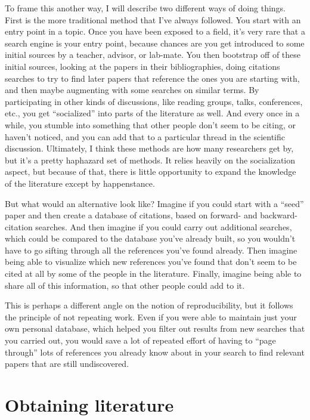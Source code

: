 \documentclass{book}
\begin{document}
To frame this another way, I will describe two different ways of doing things.  First is the more traditional method that I've always followed. You start with an entry point in a topic.  Once you have been exposed to a field, it's very rare that a search engine is your entry point, because chances are you get introduced to some initial sources by a teacher, advisor, or lab-mate.  You then bootstrap off of these initial sources, looking at the papers in their bibliographies, doing citations searches to try to find later papers that reference the ones you are starting with, and then maybe augmenting with some searches on similar terms.  By participating in other kinds of discussions, like reading groups, talks, conferences, etc., you get ``socialized'' into parts of the literature as well.  And every once in a while, you stumble into something that other people don't seem to be citing, or haven't noticed, and you can add that to a particular thread in the scientific discussion.  Ultimately, I think these methods are how many researchers get by, but it's a pretty haphazard set of methods.  It relies heavily on the socialization aspect, but because of that, there is little opportunity to expand the knowledge of the literature except by happenstance.

But what would an alternative look like?  Imagine if you could start with a ``seed'' paper and then create a database of citations, based on forward- and backward- citation searches.  And then imagine if you could carry out additional searches, which could be compared to the database you've already built, so you wouldn't have to go sifting through all the references you've found already. Then imagine being able to visualize which new references you've found that don't seem to be cited at all by some of the people in the literature. Finally, imagine being able to share all of this information, so that other people could add to it.

This is perhaps a different angle on the notion of reproducibility, but it follows the principle of not repeating work.  Even if you were able to maintain just your own personal database, which helped you filter out results from new searches that you carried out, you would save a lot of repeated effort of having to ``page through'' lots of references you already know about in your search to find relevant papers that are still undiscovered.
\section{Obtaining literature}
\label{sec-4-2}
\end{document}
